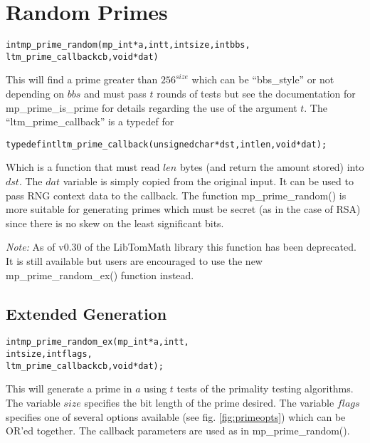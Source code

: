 \documentclass[synpaper]{book}
\begin{document}
\section{Random Primes}
\begin{alltt}
int mp_prime_random(mp_int *a, int t, int size, int bbs,
                    ltm_prime_callback cb, void *dat)
\end{alltt}
This will find a prime greater than $256^{size}$ which can be ``bbs\_style'' or not depending on $bbs$ and must pass
$t$ rounds of tests but see the documentation for mp\_prime\_is\_prime for details regarding the use of the argument $t$.
The ``ltm\_prime\_callback'' is a typedef for

\begin{alltt}
typedef int ltm_prime_callback(unsigned char *dst, int len, void *dat);
\end{alltt}

Which is a function that must read $len$ bytes (and return the amount stored) into $dst$.  The $dat$ variable is simply
copied from the original input.  It can be used to pass RNG context data to the callback.  The function
mp\_prime\_random() is more suitable for generating primes which must be secret (as in the case of RSA) since there
is no skew on the least significant bits.

\textit{Note:}  As of v0.30 of the LibTomMath library this function has been deprecated.  It is still available
but users are encouraged to use the new mp\_prime\_random\_ex() function instead.

\subsection{Extended Generation}
\begin{alltt}
int mp_prime_random_ex(mp_int *a,    int t,
                       int     size, int flags,
                       ltm_prime_callback cb, void *dat);
\end{alltt}
This will generate a prime in $a$ using $t$ tests of the primality testing algorithms.  The variable $size$
specifies the bit length of the prime desired.  The variable $flags$ specifies one of several options available
(see fig. \ref{fig:primeopts}) which can be OR'ed together.  The callback parameters are used as in
mp\_prime\_random().
\end{document}
